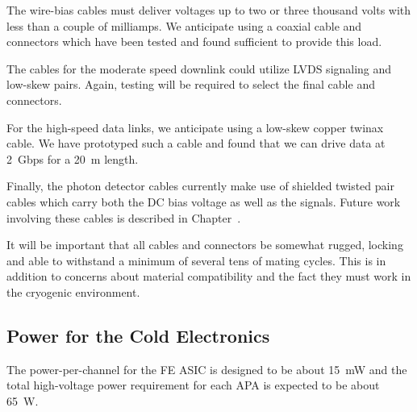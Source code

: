 The wire-bias cables must deliver voltages up to %
two or three  thousand volts with less than a couple of milliamps.
We anticipate using a coaxial cable and connectors which have been tested and found sufficient to provide this load.

The cables for the moderate speed downlink could utilize LVDS signaling and low-skew pairs.
Again, testing will be required to %
select the final cable and connectors.

For the high-speed data links, we anticipate using a low-skew copper twinax cable.
We have prototyped such a cable and found that we can drive data at 2~Gbps for a 20~m length.

Finally, the photon detector cables currently make use of shielded twisted pair cables which carry both
the DC bias voltage as well as the signals.
Future work involving these cables is described in Chapter~\cite{ch:photon}.

It will be important that all cables and connectors be somewhat rugged,
locking and able to withstand a minimum of several tens of mating cycles.
This is in addition to concerns about material compatibility and the fact they must work in the cryogenic environment.

%
\subsection{Power for the Cold Electronics }
\label{subsec:ce_feedthrough_power}


The power-per-channel for the FE ASIC is designed to be about 15~mW and
the total high-voltage  power requirement for each APA is expected to be about 65~W. 

